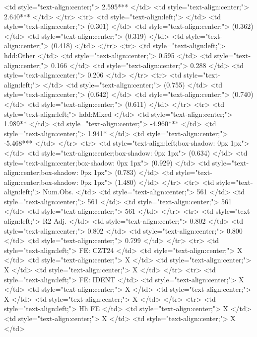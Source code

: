    <td style="text-align:center;"> 2.595*** </td>
   <td style="text-align:center;"> 2.640*** </td>
  </tr>
  <tr>
   <td style="text-align:left;">  </td>
   <td style="text-align:center;"> (0.301) </td>
   <td style="text-align:center;"> (0.362) </td>
   <td style="text-align:center;"> (0.319) </td>
   <td style="text-align:center;"> (0.418) </td>
  </tr>
  <tr>
   <td style="text-align:left;"> hdd:Other </td>
   <td style="text-align:center;"> 0.595 </td>
   <td style="text-align:center;"> 0.166 </td>
   <td style="text-align:center;"> 0.288 </td>
   <td style="text-align:center;"> 0.206 </td>
  </tr>
  <tr>
   <td style="text-align:left;">  </td>
   <td style="text-align:center;"> (0.755) </td>
   <td style="text-align:center;"> (0.642) </td>
   <td style="text-align:center;"> (0.740) </td>
   <td style="text-align:center;"> (0.611) </td>
  </tr>
  <tr>
   <td style="text-align:left;"> hdd:Mixed </td>
   <td style="text-align:center;"> 1.989** </td>
   <td style="text-align:center;"> -4.960*** </td>
   <td style="text-align:center;"> 1.941* </td>
   <td style="text-align:center;"> -5.468*** </td>
  </tr>
  <tr>
   <td style="text-align:left;box-shadow: 0px 1px">  </td>
   <td style="text-align:center;box-shadow: 0px 1px"> (0.634) </td>
   <td style="text-align:center;box-shadow: 0px 1px"> (0.929) </td>
   <td style="text-align:center;box-shadow: 0px 1px"> (0.783) </td>
   <td style="text-align:center;box-shadow: 0px 1px"> (1.480) </td>
  </tr>
  <tr>
   <td style="text-align:left;"> Num.Obs. </td>
   <td style="text-align:center;"> 561 </td>
   <td style="text-align:center;"> 561 </td>
   <td style="text-align:center;"> 561 </td>
   <td style="text-align:center;"> 561 </td>
  </tr>
  <tr>
   <td style="text-align:left;"> R2 Adj. </td>
   <td style="text-align:center;"> 0.802 </td>
   <td style="text-align:center;"> 0.802 </td>
   <td style="text-align:center;"> 0.800 </td>
   <td style="text-align:center;"> 0.799 </td>
  </tr>
  <tr>
   <td style="text-align:left;"> FE: CZT24 </td>
   <td style="text-align:center;"> X </td>
   <td style="text-align:center;"> X </td>
   <td style="text-align:center;"> X </td>
   <td style="text-align:center;"> X </td>
  </tr>
  <tr>
   <td style="text-align:left;"> FE: IDENT </td>
   <td style="text-align:center;"> X </td>
   <td style="text-align:center;"> X </td>
   <td style="text-align:center;"> X </td>
   <td style="text-align:center;"> X </td>
  </tr>
  <tr>
   <td style="text-align:left;"> Hh FE </td>
   <td style="text-align:center;"> X </td>
   <td style="text-align:center;"> X </td>
   <td style="text-align:center;"> X </td>
